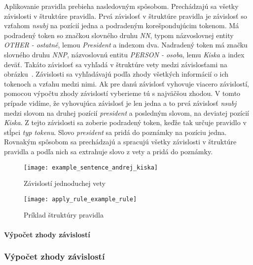 Aplikovanie pravidla prebieha nasledovným spôsobom. Prechádzajú sa všetky závislosti v štruktúre pravidla. Prvá závislosť v štruktúre pravidla je závislosť so vzťahom \textit{nsubj} na pozícií jedna a podradeným korešpondujúcim tokenom. Má podradený token so značkou slovného druhu \textit{NN}, typom názvoslovnej entity \textit{OTHER - ostatné}, lemou \textit{President} a indexom dva. Nadradený token má značku slovného druhu \textit{NNP}, názvoslovnú entitu \textit{PERSON - osoba}, lemu \textit{Kiska} a index deväť. Takáto závislosť sa vyhľadá v štruktúre vety medzi závislosťami na obrázku~. Závislosti sa vyhľadávajú podľa zhody všetkých informácií o ich tokenoch a vzťahu medzi nimi. Ak pre danú závislosť vyhovuje viacero závislostí, pomocou výpočtu zhody závislostí vyberieme tú s najväčšou zhodou. V tomto prípade vidíme, že vyhovujúca závislosť je len jedna a to prvá závislosť \textit{nsubj} medzi slovom na druhej pozícií \textit{president} a posledným slovom, na deviatej pozícií \textit{Kiska}. Z tejto závislosti sa zoberie podradený token, keďže tak určuje pravidlo v stĺpci \textit{typ tokenu}. Slovo \textit{president} sa pridá do poznámky na pozíciu jedna. Rovnakým spôsobom sa prechádzajú a spracujú všetky závislosti v štruktúre pravidla a podľa nich sa extrahuje slovo z vety a pridá do poznámky.

\begin{figure}[H]
	\begin{center}\texttt{[image: example\_sentence\_andrej\_kiska]}\end{center}
	\caption[Závislostí jednoduchej vety]{Závislostí jednoduchej vety}\label{fig:example_sentence_andrej_kiska}
\end{figure}

\begin{figure}[H]
	\begin{center}\texttt{[image: apply\_rule\_example\_rule]}\end{center}
	\caption[Príklad štruktúry pravidla]{Príklad štruktúry pravidla}\label{fig:apply_rule_example_rule}
\end{figure}

%
%
{
	\paragraph{Výpočet zhody závislostí}
}
{
	\subsubsection{Výpočet zhody závislostí}
}
\label{paragraph:dependency_match}

